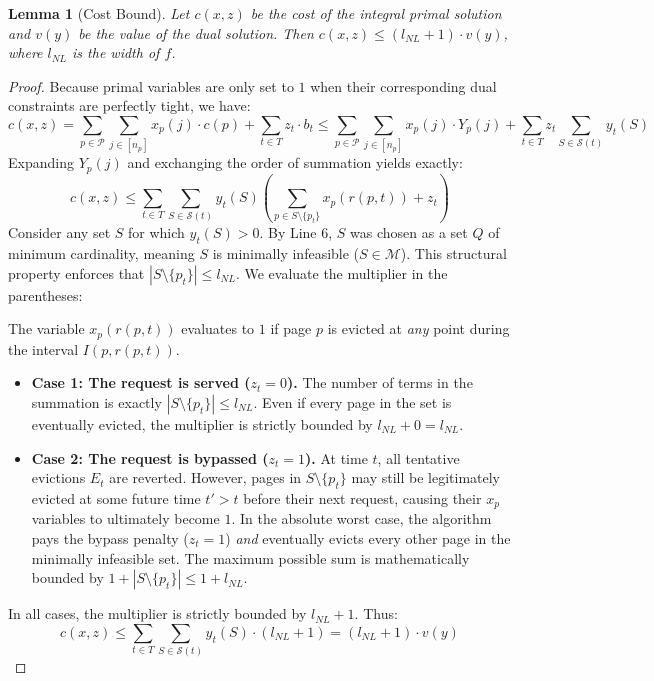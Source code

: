 \documentclass[a4paper]{article}
\newtheorem{lemma}{Lemma}      %
\begin{document}
\begin{lemma}[Cost Bound]
\label{lemma:cost_bound_rejections}
Let $c(x,z)$ be the cost of the integral primal solution and $v(y)$ be the value of the dual solution. Then $c(x,z) \le (l_{NL} + 1) \cdot v(y)$, where $l_{NL}$ is the width of $f$.
\end{lemma}
\begin{proof}
Because primal variables are only set to $1$ when their corresponding dual constraints are perfectly tight, we have:
\[
c(x,z) = \sum_{p \in \mathcal{P}} \sum_{j \in [n_p]} x_p(j) \cdot c(p) + \sum_{t \in T} z_t \cdot b_t \le \sum_{p \in \mathcal{P}} \sum_{j \in [n_p]} x_p(j) \cdot Y_p(j) + \sum_{t \in T} z_t \sum_{S \in \mathcal{S}(t)} y_t(S)
\]
Expanding $Y_p(j)$ and exchanging the order of summation yields exactly:
\[
c(x,z) \le \sum_{t \in T} \sum_{S \in \mathcal{S}(t)} y_t(S) \left( \sum_{p \in S \setminus \{p_t\}} x_p(r(p,t)) + z_t \right)
\]
Consider any set $S$ for which $y_t(S) > 0$. By Line 6, $S$ was chosen as a set $Q$ of minimum cardinality, meaning $S$ is minimally infeasible ($S \in \mathcal{M}$). This structural property enforces that $|S \setminus \{p_t\}| \le l_{NL}$. We evaluate the multiplier in the parentheses:

The variable $x_p(r(p,t))$ evaluates to $1$ if page $p$ is evicted at \textit{any} point during the interval $I(p, r(p,t))$.
\begin{itemize}
    \item \textbf{Case 1: The request is served ($z_t = 0$).} The number of terms in the summation is exactly $|S \setminus \{p_t\}| \le l_{NL}$. Even if every page in the set is eventually evicted, the multiplier is strictly bounded by $l_{NL} + 0 = l_{NL}$.
    \item \textbf{Case 2: The request is bypassed ($z_t = 1$).} At time $t$, all tentative evictions $E_t$ are reverted. However, pages in $S \setminus \{p_t\}$ may still be legitimately evicted at some future time $t' > t$ before their next request, causing their $x_p$ variables to ultimately become $1$. In the absolute worst case, the algorithm pays the bypass penalty ($z_t = 1$) \textit{and} eventually evicts every other page in the minimally infeasible set. The maximum possible sum is mathematically bounded by $1 + |S \setminus \{p_t\}| \le 1 + l_{NL}$.
\end{itemize}

In all cases, the multiplier is strictly bounded by $l_{NL} + 1$. Thus:
\[
c(x,z) \le \sum_{t \in T} \sum_{S \in \mathcal{S}(t)} y_t(S) \cdot (l_{NL} + 1) = (l_{NL} + 1) \cdot v(y)
\]
\end{proof}
\end{document}
